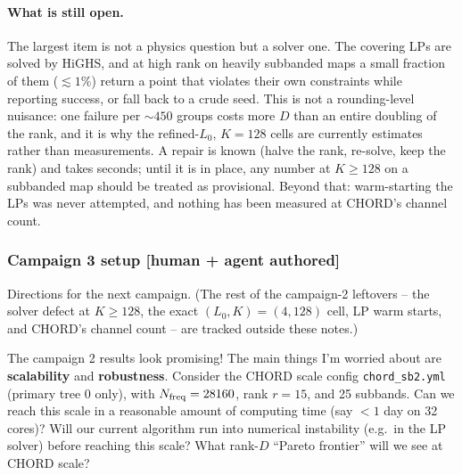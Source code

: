 \documentclass{article}
\numberwithin{equation}{section}   %
\begin{document}
\paragraph{What is still open.}
The largest item is not a physics question but a solver one. The covering LPs are solved by HiGHS,
and at high rank on heavily subbanded maps a small fraction of them ($\lesssim 1\%$) return a
point that violates their own constraints while reporting success, or fall back to a crude seed.
This is not a rounding-level nuisance: one failure per $\sim450$ groups costs more $D$ than an
entire doubling of the rank, and it is why the refined-$L_0$, $K = 128$ cells are currently
estimates rather than measurements. A repair is known (halve the rank, re-solve, keep the rank)
and takes seconds; until it is in place, any number at $K \ge 128$ on a subbanded map should be
treated as provisional. Beyond that: warm-starting the LPs was never attempted, and nothing has
been measured at CHORD's channel count.

\subsubsection{Campaign 3 setup [human + agent authored]}
\label{ssec:campaign3_setup}

Directions for the next campaign. (The rest of the campaign-2 leftovers -- the solver defect at
$K \ge 128$, the exact $(L_0, K) = (4, 128)$ cell, LP warm starts, and CHORD's channel count --
are tracked outside these notes.)

The campaign 2 results look promising!
The main things I'm worried about are {\bf scalability} and {\bf robustness}.
Consider the CHORD scale config \verb|chord_sb2.yml| (primary tree 0 only), with
$N_{\rm freq} = 28160$, rank $r=15$, and 25 subbands.
Can we reach this scale in a reasonable amount of computing time (say $<1$ day on 32 cores)?
Will our current algorithm run into numerical instability (e.g.\ in the LP solver) before
reaching this scale?
What rank-$D$ ``Pareto frontier'' will we see at CHORD scale?
\end{document}
